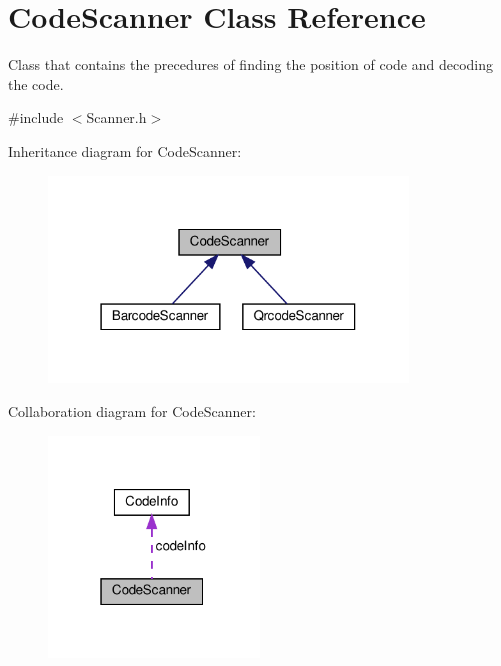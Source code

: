 \hypertarget{classCodeScanner}{}\section{Code\+Scanner Class Reference}
\label{classCodeScanner}


Class that contains the precedures of finding the position of code and decoding the code.  




{\ttfamily \#include $<$Scanner.\+h$>$}



Inheritance diagram for Code\+Scanner\+:\nopagebreak
\begin{figure}[H]
\begin{center}
\leavevmode
\includegraphics[width=271pt]{classCodeScanner__inherit__graph}
\end{center}
\end{figure}


Collaboration diagram for Code\+Scanner\+:\nopagebreak
\begin{figure}[H]
\begin{center}
\leavevmode
\includegraphics[width=159pt]{classCodeScanner__coll__graph}
\end{center}
\end{figure}
